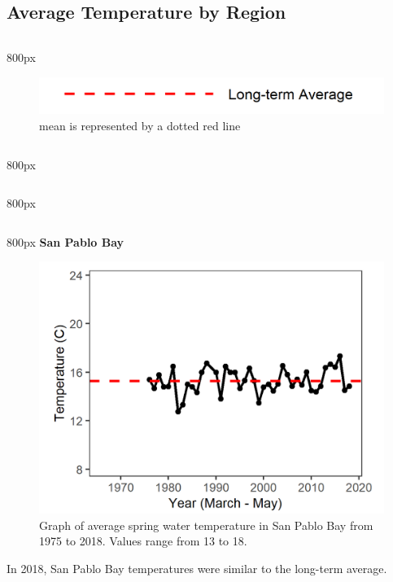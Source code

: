 \documentclass[
]{book}
\begin{document}
\hypertarget{average-temperature-by-region}{%
\subsection{Average Temperature by Region}\label{average-temperature-by-region}}

\begin{column}{800px\textwidth}
\begin{figure}
\includegraphics[width=15.25in]{figures/mline} \caption{mean is represented by a dotted red line}\label{fig:unnamed-chunk-13}
\end{figure}
\end{column}

\begin{column}{800px\textwidth}
\end{column}

\begin{column}{800px\textwidth}
\end{column}

\begin{column}{800px\textwidth}
\textbf{San Pablo Bay}

\begin{figure}
\includegraphics[width=15.25in]{figures/temp_splspring} \caption{Graph of average spring water temperature in San Pablo Bay from 1975 to 2018. Values range from 13 to 18.}\label{fig:unnamed-chunk-14}
\end{figure}

In 2018, San Pablo Bay temperatures were similar to the long-term average.
\end{column}
\end{document}
